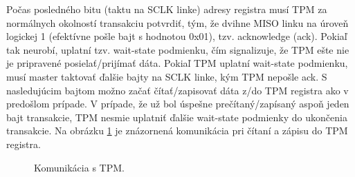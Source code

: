 Počas posledného bitu (taktu na SCLK linke) adresy registra musí TPM za normálnych okolností transakciu potvrdiť, tým, že dvihne MISO linku na úroveň logickej 1 (efektívne pošle bajt s hodnotou 0x01), tzv. acknowledge (ack). Pokiaľ tak neurobí, uplatní tzv. wait-state podmienku, čím signalizuje, že TPM ešte nie je pripravené posielať/prijímať dáta. Pokiaľ TPM uplatní wait-state podmienku, musí master taktovať ďalšie bajty na SCLK linke, kým TPM nepošle ack. S nasledujúcim bajtom možno začať čítať/zapisovať dáta z/do TPM registra ako v predošlom prípade. V prípade, že už bol úspešne prečítaný/zapísaný aspoň jeden bajt transakcie, TPM nesmie uplatniť ďalšie wait-state podmienky do ukončenia transakcie. Na obrázku \ref{obr:tpmRW} je znázornená komunikácia pri čítaní a zápisu do TPM registra.

\begin{figure}
    \centering
    \vfill
    \vfill
    \vfill
    \caption[Komunikácia s TPM]{Komunikácia s TPM.}
    \label{obr:tpmRW}
\end{figure}

